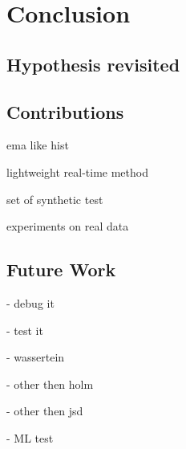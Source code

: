 \chapter{Conclusion} \label{chap:conclusion} \minitoc


\section{Hypothesis revisited}

\section{Contributions}
ema like hist

lightweight real-time method

set of synthetic test

experiments on real data

\section{Future Work}

- debug it

- test it

- wassertein

- other then holm

- other then jsd

- ML test


